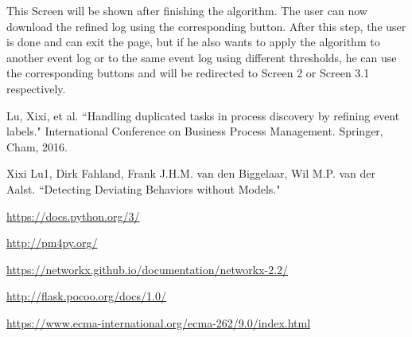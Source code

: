 \documentclass[notitlepage]{article}
\begin{document}
\begin{flushleft}
This Screen will be shown after finishing the algorithm. The user can now download the refined log using the corresponding button. After this step, the user is done and can exit the page, but if he also wants to apply the algorithm to another event log or to the same event log using different thresholds, he can use the corresponding buttons and will be redirected to Screen 2 or Screen 3.1 respectively.


%
%  




\end{flushleft}
%



\begin{thebibliography}{10}
Lu, Xixi, et al. ``Handling duplicated tasks in process discovery by refining event labels." International Conference on Business Process Management. Springer, Cham, 2016.

Xixi Lu1, Dirk Fahland, Frank J.H.M. van den Biggelaar, Wil M.P. van der Aalst. ``Detecting Deviating Behaviors without Models."

\url{https://docs.python.org/3/}

\url{http://pm4py.org/}

\url{https://networkx.github.io/documentation/networkx-2.2/}

\url{http://flask.pocoo.org/docs/1.0/}

\url{https://www.ecma-international.org/ecma-262/9.0/index.html}


\end{thebibliography}
\end{document}
